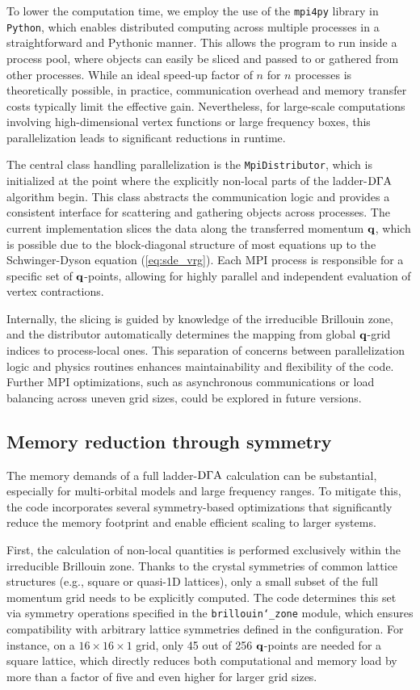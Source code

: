 \documentclass[\main/main.tex]{subfiles}
\begin{document}
To lower the computation time, we employ the use of the \texttt{mpi4py} library in \texttt{Python}, which enables distributed computing across multiple processes in a straightforward and Pythonic manner. This allows the program to run inside a process pool, where objects can easily be sliced and passed to or gathered from other processes. While an ideal speed-up factor of $n$ for $n$ processes is theoretically possible, in practice, communication overhead and memory transfer costs typically limit the effective gain. Nevertheless, for large-scale computations involving high-dimensional vertex functions or large frequency boxes, this parallelization leads to significant reductions in runtime.

The central class handling parallelization is the \texttt{MpiDistributor}, which is initialized at the point where the explicitly non-local parts of the ladder-$\text{D}\Gamma\text{A}$ algorithm begin. This class abstracts the communication logic and provides a consistent interface for scattering and gathering objects across processes. The current implementation slices the data along the transferred momentum $\textbf{q}$, which is possible due to the block-diagonal structure of most equations up to the Schwinger-Dyson equation (\ref{eq:sde_vrg}). Each MPI process is responsible for a specific set of $\textbf{q}$-points, allowing for highly parallel and independent evaluation of vertex contractions.

Internally, the slicing is guided by knowledge of the irreducible Brillouin zone, and the distributor automatically determines the mapping from global $\textbf{q}$-grid indices to process-local ones. This separation of concerns between parallelization logic and physics routines enhances maintainability and flexibility of the code. Further MPI optimizations, such as asynchronous communications or load balancing across uneven grid sizes, could be explored in future versions. 

\subsection{Memory reduction through symmetry}

The memory demands of a full ladder-$\text{D}\Gamma\text{A}$ calculation can be substantial, especially for multi-orbital models and large frequency ranges. To mitigate this, the code incorporates several symmetry-based optimizations that significantly reduce the memory footprint and enable efficient scaling to larger systems.

First, the calculation of non-local quantities is performed exclusively within the irreducible Brillouin zone. Thanks to the crystal symmetries of common lattice structures (e.g., square or quasi-1D lattices), only a small subset of the full momentum grid needs to be explicitly computed. The code determines this set via symmetry operations specified in the \texttt{brillouin\char`_zone} module, which ensures compatibility with arbitrary lattice symmetries defined in the configuration. For instance, on a $16\times16\times1$ grid, only 45 out of 256 $\textbf{q}$-points are needed for a square lattice, which directly reduces both computational and memory load by more than a factor of five and even higher for larger grid sizes.
\end{document}
